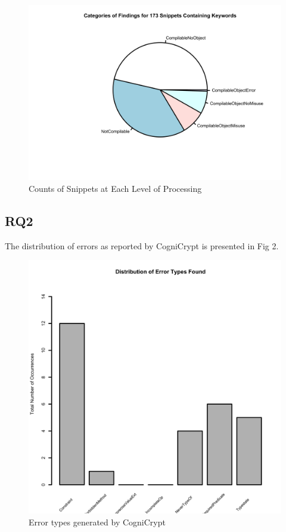 \documentclass[10pt, conference]{IEEEtran}
\begin{document}
\begin{figure}[h]
\begin{center}
\includegraphics[width=1.0\linewidth]{PiePureMatch.png}
\caption{Counts of Snippets at Each Level of Processing}
\end{center}
\end{figure}

\subsection{RQ2}

The distribution of errors as reported by CogniCrypt is presented in Fig 2.

\begin{figure}[h]
\begin{center}
\includegraphics[width=0.9\linewidth]{Dist.png}
\caption{Error types generated by CogniCrypt}
\end{center}
\end{figure}
\end{document}
